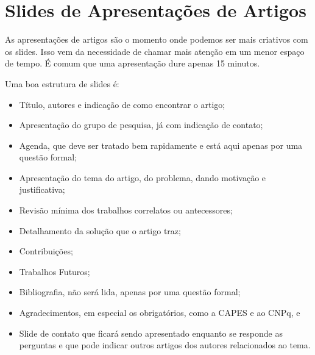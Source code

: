 \section{Slides de Apresentações de Artigos}

As apresentações de artigos são o momento onde podemos ser mais criativos com os slides. Isso vem da necessidade de chamar mais atenção em um menor espaço de tempo. É comum que uma apresentação dure apenas 15 minutos.


Uma boa estrutura de slides é:
\begin{itemize}
    \item Título, autores e indicação de como encontrar o artigo;
    \item Apresentação do grupo de pesquisa, já com indicação de contato;
    \item Agenda, que deve ser tratado bem rapidamente e está aqui apenas por uma questão formal;
    \item Apresentação do tema do artigo, do problema, dando motivação e justificativa;
    \item Revisão mínima dos trabalhos correlatos ou antecessores;
    \item Detalhamento da solução que o artigo traz;
    \item Contribuições;
    \item Trabalhos Futuros;
    \item Bibliografia, não será lida, apenas por uma questão formal;
    \item Agradecimentos, em especial os obrigatórios, como a CAPES e ao CNPq, e
    \item Slide de contato que ficará sendo apresentado enquanto se responde as perguntas e que pode indicar outros artigos dos autores relacionados ao tema.
\end{itemize}

